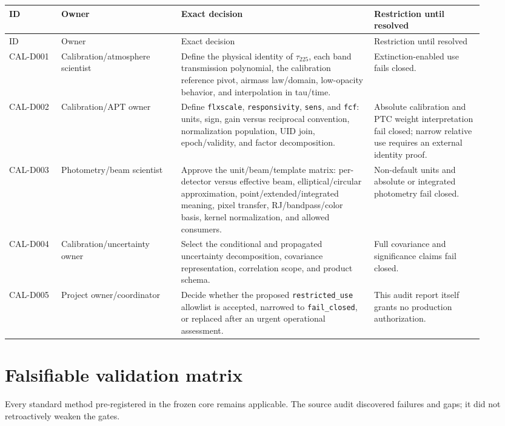 \documentclass[11pt]{article}
\newcommand{\code}[1]{\nolinkurl{#1}}
\begin{document}
\begin{longtable}{L{0.10\linewidth}L{0.23\linewidth}L{0.37\linewidth}L{0.21\linewidth}}
\toprule
ID & Owner & Exact decision & Restriction until resolved\\
\midrule
\endfirsthead
\toprule
ID & Owner & Exact decision & Restriction until resolved\\
\midrule
\endhead
CAL-D001 & Calibration/atmosphere scientist & Define the physical identity of
\(\tau_{225}\), each band transmission polynomial, the calibration reference
pivot, airmass law/domain, low-opacity behavior, and interpolation in tau/time.
& Extinction-enabled use fails closed.\\
CAL-D002 & Calibration/APT owner & Define \code{flxscale},
\code{responsivity}, \code{sens}, and \code{fcf}: units, sign, gain versus
reciprocal convention, normalization population, UID join, epoch/validity, and
factor decomposition. & Absolute calibration and PTC weight interpretation
fail closed; narrow relative use requires an external identity proof.\\
CAL-D003 & Photometry/beam scientist & Approve the unit/beam/template matrix:
per-detector versus effective beam, elliptical/circular approximation,
point/extended/integrated meaning, pixel transfer, RJ/bandpass/color basis,
kernel normalization, and allowed consumers. & Non-default units and absolute
or integrated photometry fail closed.\\
CAL-D004 & Calibration/uncertainty owner & Select the conditional and
propagated uncertainty decomposition, covariance representation, correlation
scope, and product schema. & Full covariance and significance claims fail
closed.\\
CAL-D005 & Project owner/coordinator & Decide whether the proposed
\code{restricted_use} allowlist is accepted, narrowed to \code{fail_closed},
or replaced after an urgent operational assessment. & This audit report itself
grants no production authorization.\\
\bottomrule
\end{longtable}

\section{Falsifiable validation matrix}
\label{sec:validation}

Every standard method pre-registered in the frozen core remains applicable.
The source audit discovered failures and gaps; it did not retroactively weaken
the gates.
\end{document}
